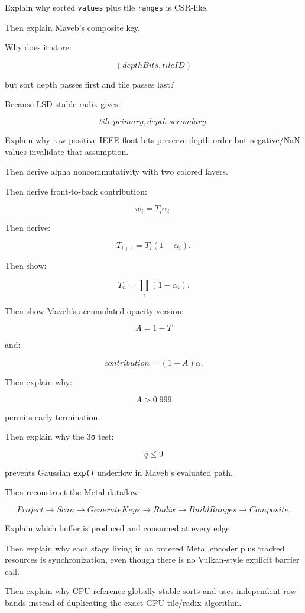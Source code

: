 Explain why sorted \texttt{values} plus tile \texttt{ranges} is CSR-like.

Then explain Maveb's composite key.

Why does it store:

\[
(depthBits,tileID)
\]

but sort depth passes first and tile passes last?

Because LSD stable radix gives:

\[
\boxed{
tile\ primary,
depth\ secondary.
}
\]

Explain why raw positive IEEE float bits preserve depth order but negative/NaN values invalidate that assumption.

Then derive alpha noncommutativity with two colored layers.

Then derive front-to-back contribution:

\[
w_i=
T_i\alpha_i.
\]

Then derive:

\[
T_{i+1}
=
T_i(1-\alpha_i).
\]

Then show:

\[
T_n=
\prod_i(1-\alpha_i).
\]

Then show Maveb's accumulated-opacity version:

\[
A=1-T
\]

and:

\[
contribution=
(1-A)\alpha.
\]

Then explain why:

\[
A>0.999
\]

permits early termination.

Then explain why the 3σ test:

\[
q\le9
\]

prevents Gaussian \texttt{exp()} underflow in Maveb's evaluated path.

Then reconstruct the Metal dataflow:

\[
Project
\rightarrow
Scan
\rightarrow
GenerateKeys
\rightarrow
Radix
\rightarrow
BuildRanges
\rightarrow
Composite.
\]

Explain which buffer is produced and consumed at every edge.

Then explain why each stage living in an ordered Metal encoder plus tracked resources is synchronization, even though there is no Vulkan-style explicit barrier call.

Then explain why CPU reference globally stable-sorts and uses independent row bands instead of duplicating the exact GPU tile/radix algorithm.

